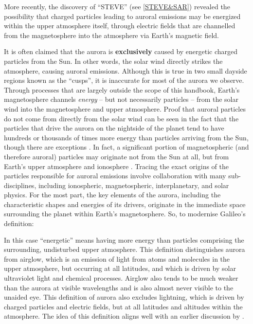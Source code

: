 \documentclass{article}
\renewcommand{\cite}[1]{\parencite{#1}}
\begin{document}
More recently, the discovery of ``STEVE'' (see \ref{STEVE&SAR}) \cite{MacDonald2018} revealed the possibility that charged particles leading to auroral emissions may be energized within the upper atmosphere itself, through electric fields that are channelled from the magnetosphere into the atmosphere via Earth's magnetic field.

It is often claimed that the aurora is \textbf{exclusively} caused by energetic charged particles from the Sun. In other words, the solar wind directly strikes the atmosphere, causing auroral emissions. Although this is true in two small dayside regions known as the ``cusps'',  it is inaccurate for most of the aurora we observe. Through processes that are largely outside the scope of this handbook, Earth's magnetosphere channels {\it energy} -- but not necessarily particles -- from the solar wind into the magnetosphere and upper atmosphere.   
Proof that auroral particles do not come from directly from the solar wind can be seen in the fact that the particles that drive the aurora on the nightside of the planet tend to have hundreds or thousands of times more energy than particles arriving from the Sun, though there are exceptions \cite{Hosokawa2024}. In fact, a significant portion of magnetospheric (and therefore auroral) particles may originate not from the Sun at all, but from Earth's upper atmosphere and ionosphere \cite{Chappell1987}. Tracing the exact origins of the particles responsible for auroral emissions involve collaboration with many sub-disciplines, including ionospheric, magnetospheric, interplanetary, and solar physics. For the most part, the key elements of the aurora, including the characteristic shapes and energies of its drivers, originate in the immediate space surrounding the planet within Earth's magnetosphere. 
So, to modernise Galileo's definition: 
\newline
\noindent{} 
\newline

In this case ``energetic'' means having more energy than particles comprising the surrounding, undisturbed upper atmosphere. This definition distinguishes aurora from airglow, which is an emission of light from atoms and molecules in the upper atmosphere, but occurring at all latitudes, and which is driven by solar ultraviolet light and chemical processes. Airglow also tends to be much weaker than the aurora at visible wavelengths and is also almost never visible to the unaided eye. This definition of aurora also excludes lightning, which is driven by charged particles and electric fields, but at all latitudes and altitudes within the atmosphere. The idea of this definition aligns well with an earlier discussion by \textcite{clarke2004}.
\end{document}
